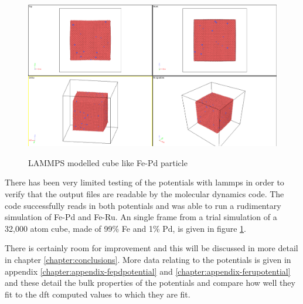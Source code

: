 \begin{figure}[htb]
\includegraphics[width=.94\linewidth]{chapters/potentials_fe_pd_ru/lammps/fepd_fct_cube_particle.png} 
\label{fig:fepd-lammps-trial}
\caption{LAMMPS modelled cube like Fe-Pd particle}
\end{figure}

There has been very limited testing of the potentials with \acrshort{lammps} in order to verify that the output files are readable by the molecular dynamics code.  The code successfully reads in both potentials and was able to run a rudimentary simulation of Fe-Pd and Fe-Ru.  An single frame from a trial simulation of a 32,000 atom cube, made of 99\% Fe and 1\% Pd, is given in figure \ref{fig:fepd-lammps-trial}.

There is certainly room for improvement and this will be discussed in more detail in chapter \ref{chapter:conclusions}.  More data relating to the potentials is given in appendix \ref{chapter:appendix-fepdpotential} and \ref{chapter:appendix-ferupotential} and these detail the bulk properties of the potentials and compare how well they fit to the \acrshort{dft} computed values to which they are fit.




